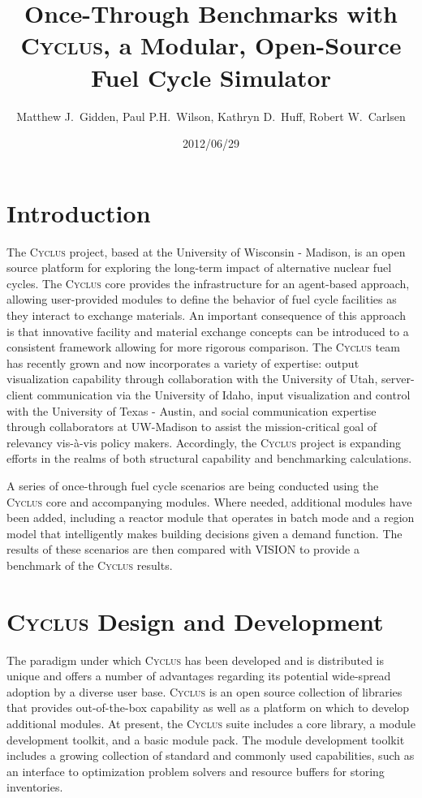 \documentclass{anstrans}
\title{Once-Through Benchmarks with \textsc{Cyclus}, a Modular, Open-Source Fuel Cycle Simulator}
\author{Matthew J.~Gidden, Paul P.H.~Wilson, Kathryn D.~Huff, Robert W.~Carlsen}
\institute{Department of Nuclear Engineering \& Engineering Physics, University of Wisconsin - Madison, Madison, WI, 53703}
\date{2012/06/29}
\begin{document}
\section{Introduction}
The \textsc{Cyclus} project, based at the University of Wisconsin -
Madison, is an open source platform for exploring the long-term impact
of alternative nuclear fuel cycles.  The \textsc{Cyclus} core provides
the infrastructure for an agent-based approach, allowing user-provided
modules to define the behavior of fuel cycle facilities as they
interact to exchange materials.  An important consequence of this
approach is that innovative facility and material exchange concepts
can be introduced to a consistent framework allowing for more rigorous
comparison.  The \textsc{Cyclus} team has recently grown and now
incorporates a variety of expertise: output visualization capability
through collaboration with the University of Utah, server-client
communication via the University of Idaho, input visualization and
control with the University of Texas - Austin, and social
communication expertise through collaborators at UW-Madison to assist
the mission-critical goal of relevancy vis-\`{a}-vis policy
makers. Accordingly, the \textsc{Cyclus} project is expanding efforts in
the realms of both structural capability and benchmarking
calculations.

A series of once-through fuel cycle scenarios are being conducted
using the \textsc{Cyclus} core and accompanying modules. Where needed,
additional modules have been added, including a reactor module that operates 
in batch mode and a region model that intelligently makes building decisions 
given a demand function. The results of these scenarios are then compared with
VISION \cite{vision2009} to provide a benchmark of the \textsc{Cyclus}
results.

\section{\textsc{Cyclus} Design and Development}
The paradigm under which \textsc{Cyclus} has been developed and is
distributed is unique and offers a number of advantages regarding its
potential wide-spread adoption by a diverse user base. \textsc{Cyclus}
is an open source collection of libraries that provides
out-of-the-box capability as well as a platform on which to develop
additional modules. At present, the \textsc{Cyclus} suite includes a
core library, a module development toolkit, and a basic module pack.
The module development toolkit includes a growing collection of
standard and commonly used capabilities, such as an interface to optimization 
problem solvers and resource buffers for storing inventories.
\end{document}
